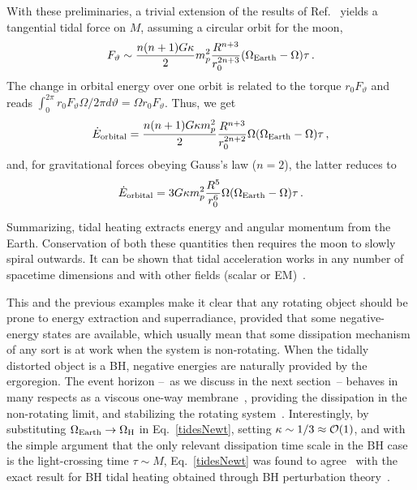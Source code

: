 \documentclass[11pt]{article}
\newcommand{\be}{\begin{equation}}
\newcommand{\ee}{\end{equation}}
\numberwithin{equation}{section} %
\begin{document}
With these preliminaries, a trivial extension of the results of Ref.~\cite{Hut:1981} yields a tangential tidal force on $M$, assuming a circular orbit for the moon, 
%
\be
F_{\vartheta}\sim \frac{n(n+1)G\kappa}{2}m_p^2\frac{R^{n+3}}{r_0^{2n+3}}(\Omega_{\rm Earth}-\Omega)\tau\,. \label{torquetides}
\ee
%
The change in orbital energy over one orbit is related to the torque $r_0F_{\vartheta}$ and reads
$\int_0^{2\pi}r_0F_{\vartheta}\Omega/2\pi d\vartheta=\Omega r_0 F_{\vartheta}$. Thus, we get
%
\be
\dot{E}_{\rm orbital}=\frac{n(n+1)G\kappa m_p^2}{2}\frac{R^{n+3}}{r_0^{2n+2}}\Omega(\Omega_{\rm Earth}-\Omega)\tau\,, \label{tidesGeneral}
\ee
%
and, for gravitational forces obeying Gauss's law ($n=2$), the latter reduces to
%
\be
\dot{E}_{\rm orbital}=3G\kappa m_p^2\frac{R^{5}}{r_0^{6}}\Omega(\Omega_{\rm Earth}-\Omega)\tau\,.\label{tidesNewt}
\ee
%


Summarizing, tidal heating extracts energy and angular momentum from the Earth. Conservation of both these quantities then requires the moon
to slowly spiral outwards. It can be shown that tidal acceleration works in any number of spacetime dimensions and with 
other fields (scalar or EM)~\cite{Cardoso:2012zn,Brito:2012gw}.



This and the previous examples make it clear that any rotating object should be prone to energy extraction and 
superradiance, provided that some negative-energy states are available, which usually mean that some dissipation 
mechanism of any sort is at work when the system is non-rotating.
When the tidally distorted object is a BH, negative energies are naturally provided by the ergoregion. The event horizon --~as we discuss in the next section~-- behaves in many respects as a viscous one-way membrane~\cite{MembraneParadigm}, providing the dissipation in the non-rotating limit, and stabilizing the rotating system~\cite{Vicente:2018mxl}. Interestingly, by substituting $\Omega_{\rm Earth}\to\Omega_{\rm H}$ in Eq.~\eqref{tidesNewt}, setting $\kappa\sim1/3\approx{\cal O}(1)$, and with the simple argument that the only relevant dissipation time scale in the BH case is the light-crossing time $\tau\sim M$, Eq.~\eqref{tidesNewt} was found to agree~\cite{Cardoso:2012zn} with the exact result for BH tidal heating obtained through BH perturbation theory~\cite{Hartle:1973zz,Hartle:1974gy,Poisson:2009di,Binnington:2009bb,Glampedakis:2013jya}.


\clearpage
\newpage
\end{document}
